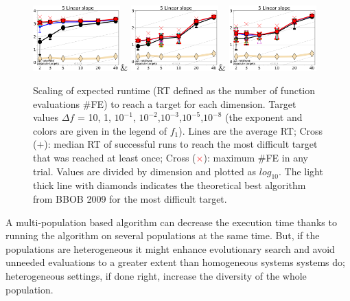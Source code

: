 \documentclass[review]{elsarticle}
\begin{document}
\begin{figure}[h!tb]
\begin{tabular}
  \includegraphics[width=0.30\textwidth]{GAOnly_f005}&
  \includegraphics[width=0.30\textwidth]{PSOOnly_f005}&
  \includegraphics[width=0.30\textwidth]{GAPSO_f005}\\
  \end{tabular}
  \vspace{-3ex}
   \caption{Scaling of expected runtime (RT defined as the number of function 
evaluations \#FE) to reach a target for  
each dimension. Target values $\Delta f$ = 10, 1, $10^{-1}$, $10^{-2}$,$10^{-3}$,$10^{-5}$,$10^{-8}$
(the exponent and colors are given in the legend of $f_1$). 
Lines are the average RT; Cross ($+$): median RT of successful runs to reach
the most difficult target that was reached at least once;
Cross (\textcolor{red}{$\times$}): maximum \#FE in any trial. 
Values are divided by dimension and plotted as $log_{10}$.
The light thick line with diamonds indicates the theoretical best algorithm from BBOB 2009 for the 
most difficult target.
}
\label{fig:bbob}
\end{figure}



A multi-population based algorithm can decrease the execution time
thanks to running the algorithm on several populations at the same
time. But, if the populations are heterogeneous 
it might enhance evolutionary search and avoid unneeded
evaluations to a greater extent than homogeneous systems systems do; heterogeneous settings, if
done right, increase the diversity of the whole population\cite{araujo2008multikulti}.
\end{document}
